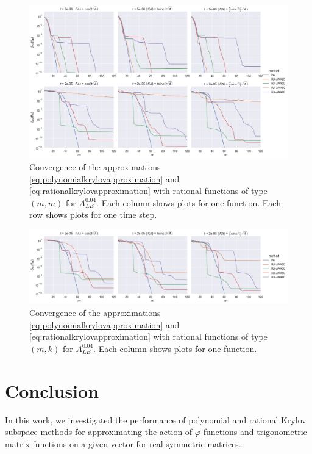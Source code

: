 \begin{figure}[h]
    \centering
    \includegraphics[width=.9\textwidth]{img/trigonometric/cnvg_h4e-02_methods_ts.png}
    \caption{
        Convergence of the approximations \eqref{eq:polynomialkrylovapproximation}
        and \eqref{eq:rationalkrylovapproximation} with rational functions of type
        $(m, m)$ for $A_{LE}^{0.04}$.
        Each column shows plots for one function.
        Each row shows plots for one time step.
        }
        \label{fig:trigonometricconvergences}
\end{figure}

\begin{figure}[h]
    \centering
    \includegraphics[width=.9\textwidth]{img/trigonometric/cnvg_h4e-02_methods_ts_mk.png}
    \caption{
        Convergence of the approximations \eqref{eq:polynomialkrylovapproximation}
        and \eqref{eq:rationalkrylovapproximation} with rational functions of type
        $(m, k)$ for $A_{LE}^{0.04}$.
        Each column shows plots for one function.
        }
        \label{fig:trigonometricconvergences_mk}
\end{figure}

\FloatBarrier

\section{Conclusion}
\label{sec:conclusion}

In this work, we investigated the performance of polynomial and rational Krylov subspace
methods for approximating the action of $\varphi$-functions and trigonometric matrix
functions on a given vector for real symmetric matrices.

